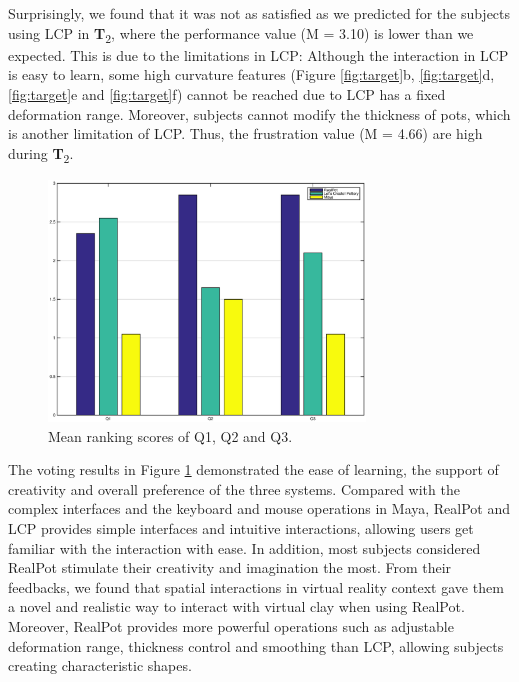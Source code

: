 Surprisingly, we found that it was not as satisfied as we predicted for the subjects using LCP in \textbf{T}\textsubscript{2}, where the performance value (M = 3.10) is lower than we expected. This is due to the limitations in LCP: Although the interaction in LCP is easy to learn, some high curvature features (Figure \ref{fig:target}b, \ref{fig:target}d, \ref{fig:target}e and \ref{fig:target}f) cannot be reached due to LCP has a fixed deformation range. Moreover, subjects cannot modify the thickness of pots, which is another limitation of LCP. Thus, the frustration value (M = 4.66) are high during \textbf{T}\textsubscript{2}.

\begin{figure}
	\includegraphics[width=0.75\textwidth]{fig15.eps}
	\caption{Mean ranking scores of Q1, Q2 and Q3.}
	\label{fig:ranking}
\end{figure}

The voting results in Figure \ref{fig:ranking} demonstrated the ease of learning, the support of creativity and overall preference of the three systems.
Compared with the complex interfaces and the keyboard and mouse operations in Maya, RealPot and LCP provides simple interfaces and intuitive interactions, allowing users get familiar with the interaction with ease.
In addition, most subjects considered RealPot stimulate their creativity and imagination the most. From their feedbacks, we found that spatial interactions in virtual reality context gave them a novel and realistic way to interact with virtual clay when using RealPot. Moreover, RealPot provides more powerful operations such as adjustable deformation range, thickness control and smoothing than LCP, allowing subjects creating characteristic shapes.

